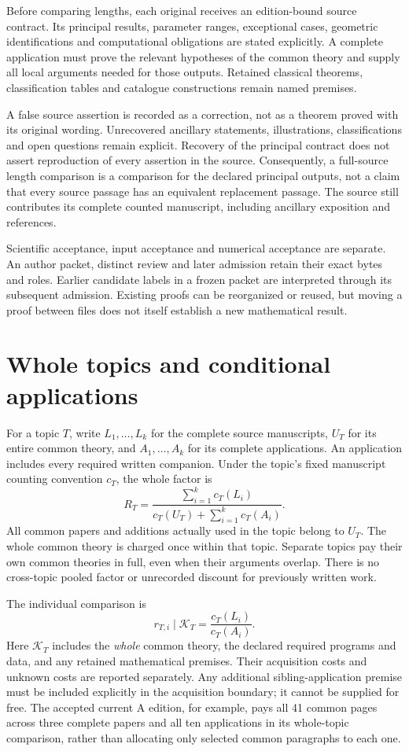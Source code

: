 \documentclass[11pt,a4paper]{article}
\begin{document}
Before comparing lengths, each original receives an edition-bound source
contract. Its principal results, parameter ranges, exceptional cases, geometric
identifications and computational obligations are stated explicitly. A complete
application must prove the relevant hypotheses of the common theory and supply
all local arguments needed for those outputs. Retained classical theorems,
classification tables and catalogue constructions remain named premises.

A false source assertion is recorded as a correction, not as a theorem proved
with its original wording. Unrecovered ancillary statements, illustrations,
classifications and open questions remain explicit. Recovery of the principal
contract does not assert reproduction of every assertion in the source.
Consequently, a full-source length comparison is a comparison for the declared
principal outputs, not a claim that every source passage has an equivalent
replacement passage. The source still contributes its complete counted
manuscript, including ancillary exposition and references.

Scientific acceptance, input acceptance and numerical acceptance are separate.
An author packet, distinct review and later admission retain their exact bytes
and roles. Earlier candidate labels in a frozen packet are interpreted through
its subsequent admission. Existing proofs can be reorganized or reused, but
moving a proof between files does not itself establish a new mathematical result.

\section{Whole topics and conditional applications}

For a topic $T$, write $L_1,\ldots,L_k$ for the complete source manuscripts,
$U_T$ for its entire common theory, and $A_1,\ldots,A_k$ for its complete
applications. An application includes every required written companion.
Under the topic's fixed manuscript counting convention $c_T$, the whole factor is
\[
 R_T=\frac{\sum_{i=1}^k c_T(L_i)}
 {c_T(U_T)+\sum_{i=1}^k c_T(A_i)}.
\]
All common papers and additions actually used in the topic belong to $U_T$.
The whole common theory is charged once within that topic. Separate topics pay
their own common theories in full, even when their arguments overlap. There is
no cross-topic pooled factor or unrecorded discount for previously written work.

The individual comparison is
\[
 r_{T,i}\mid\mathcal K_T=\frac{c_T(L_i)}{c_T(A_i)}.
\]
Here $\mathcal K_T$ includes the \emph{whole} common theory, the declared
required programs and data, and any retained mathematical premises. Their
acquisition costs and unknown costs are reported separately. Any additional
sibling-application premise must be included explicitly in the acquisition
boundary; it cannot be supplied for free. The accepted current A edition, for
example, pays all 41 common pages across three complete papers and all ten applications in its whole-topic
comparison, rather than allocating only selected common paragraphs to each one.
\end{document}
